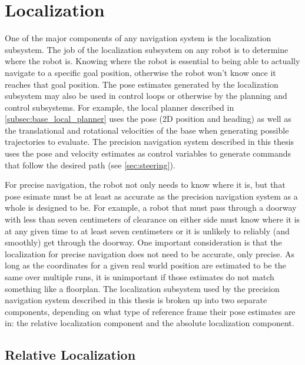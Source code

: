 \section{Localization}\label{sec:localization}

One of the major components of any navigation system is the localization subsystem. The job of the localization subsystem on any robot is to determine where the robot is. Knowing where the robot is essential to being able to actually navigate to a specific goal position, otherwise the robot won't know once it reaches that goal position. The pose estimates generated by the localization subsystem may also be used in control loops or otherwise by the planning and control subsystems. For example, the local planner described in \autoref{subsec:base_local_planner} uses the pose (2D position and heading) as well as the translational and rotational velocities of the base when generating possible trajectories to evaluate. The precision navigation system described in this thesis uses the pose and velocity estimates as control variables to generate commands that follow the desired path (see \autoref{sec:steering}).

For precise navigation, the robot not only needs to know where it is, but that pose esimate must be at least as accurate as the precision navigation system as a whole is designed to be. For example, a robot that must pass through a doorway with less than seven centimeters of clearance on either side must know where it is at any given time to at least seven centimeters or it is unlikely to reliably (and smoothly) get through the doorway. One important consideration is that the localization for precise navigation does not need to be accurate, only precise. As long as the coordinates for a given real world position are estimated to be the same over multiple runs, it is unimportant if those estimates do not match something like a floorplan. The localization subsystem used by the precision navigation system described in this thesis is broken up into two separate components, depending on what type of reference frame their pose estimates are in: the relative localization component and the absolute localization component.

\subsection{Relative Localization}\label{subsec:relative_localization}

